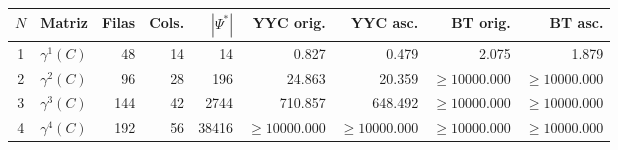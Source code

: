 \begin{tabular}{@{}clrrr|rrrr@{}}
\toprule
$N$ & Matriz & Filas & Cols. & $|\Psi^*|$ & YYC orig. & YYC asc. & BT orig. & BT asc. \\
\midrule
1 & $\gamma^{1}(C)$ & 48 & 14 & 14 & 0.827 & 0.479 & 2.075 & 1.879 \\
2 & $\gamma^{2}(C)$ & 96 & 28 & 196 & 24.863 & 20.359 & $\ge 10000.000$ & $\ge 10000.000$ \\
3 & $\gamma^{3}(C)$ & 144 & 42 & 2744 & 710.857 & 648.492 & $\ge 10000.000$ & $\ge 10000.000$ \\
4 & $\gamma^{4}(C)$ & 192 & 56 & 38416 & $\ge 10000.000$ & $\ge 10000.000$ & $\ge 10000.000$ & $\ge 10000.000$ \\
\bottomrule
\end{tabular}
